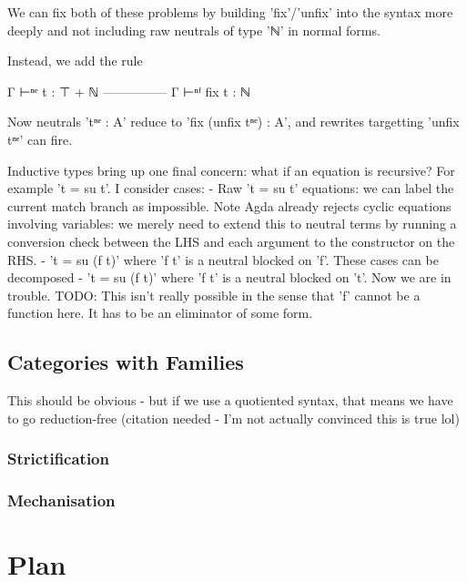 \documentclass[
    a4paper, %
    fontsize=9.5pt, %
    twoside=false, %
	numbers=noenddot, %
	fontmethod=tex, %
]{kaobook}
\begin{document}
We can fix both of these problems by building 'fix'/'unfix' into the syntax 
more deeply and not including raw neutrals of type 'ℕ' in normal forms.

Instead, we add the rule

Γ ⊢ⁿᵉ t : ⊤ + ℕ
---------------
Γ ⊢ⁿᶠ fix t : ℕ

Now neutrals 'tⁿᵉ : A' reduce to 'fix (unfix tⁿᵉ) : A', and rewrites targetting
'unfix tⁿᵉ' can fire.

Inductive types bring up one final concern: what if an equation is recursive?
For example 't = su t'. I consider cases:
- Raw 't = su t' equations: we can label the current match branch as impossible.
  Note Agda already rejects cyclic equations involving variables: we merely
  need to extend this to neutral terms by running a conversion check between the
  LHS and each argument to the constructor on the RHS.
- 't = su (f t)' where 'f t' is a neutral blocked on 'f'. These cases can
  be decomposed
- 't = su (f t)' where 'f t' is a neutral blocked on 't'. Now we are in trouble.
  TODO: This isn't really possible in the sense that 'f' cannot be a function
  here. It has to be an eliminator of some form.

\section{Categories with Families}




This should be obvious - but if we use a quotiented syntax, that means we have
to go reduction-free (citation needed - I'm not actually convinced this is true
lol)


\subsection{Strictification}

\subsection{Mechanisation}
\setchapterpreamble[u]{\margintoc}

\chapter{Plan}


% 
\printbibliography[heading=bibintoc, title=Bibliography]
\end{document}
